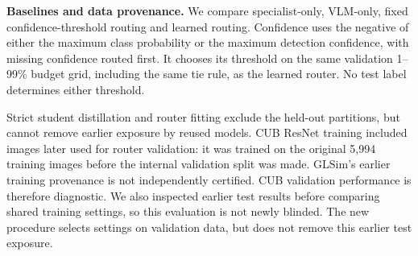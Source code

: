\textbf{Baselines and data provenance.}
We compare specialist-only, VLM-only, fixed confidence-threshold routing and learned routing. Confidence uses the negative of either the maximum class probability or the maximum detection confidence, with missing confidence routed first. It chooses its threshold on the same validation 1--99\% budget grid, including the same tie rule, as the learned router. No test label determines either threshold.

Strict student distillation and router fitting exclude the held-out partitions, but cannot remove earlier exposure by reused models. CUB ResNet training included images later used for router validation: it was trained on the original 5,994 training images before the internal validation split was made. GLSim's earlier training provenance is not independently certified. CUB validation performance is therefore diagnostic. We also inspected earlier test results before comparing shared training settings, so this evaluation is not newly blinded. The new procedure selects settings on validation data, but does not remove this earlier test exposure.

